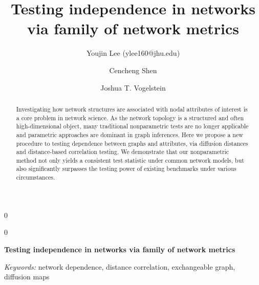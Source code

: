 \documentclass[11pt]{article}
\theoremstyle{definition}
\newcommand{\blind}{0}
\begin{document}
\def\spacingset#1{\renewcommand{\baselinestretch}%
{#1}\small\normalsize} \spacingset{1}

\title{\bf Testing independence in networks via family of network metrics}
\blind
{\author[1]{Youjin Lee (ylee160@jhu.edu)} %
	\author[2]{Cencheng Shen} %
	\author[2,3,4]{Joshua T. Vogelstein}
	\maketitle
} \fi

	\blind
	{
		\bigskip
		\bigskip
		\bigskip
		\begin{center}
			{\LARGE\bf Testing independence in networks via family of network metrics}
		\end{center}
		\medskip
	} \fi

\begin{abstract}
Investigating how network structures are associated with nodal attributes of interest is a core problem in network science. As the network topology is a structured and often high-dimensional object, many traditional nonparametric tests are no longer applicable and parametric approaches are dominant in graph inferences. Here we propose a new procedure to testing dependence between graphs and attributes, via diffusion distances and distance-based correlation testing. We demonstrate that our nonparametric method not only yields a consistent test statistic under common network models, but also significantly surpasses the testing power of existing benchmarks under various circumstances. 
\end{abstract}

\noindent%
{\it Keywords:} network dependence, distance correlation, exchangeable graph, diffusion maps

\sloppy
\doublespacing
\end{document}
